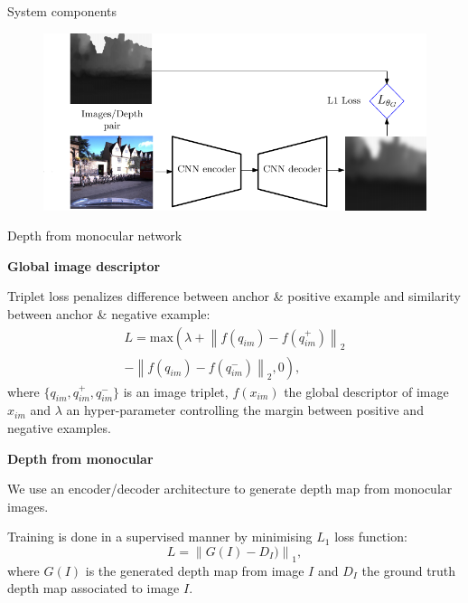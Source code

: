 \documentclass[final]{beamer}
\newlength{\colwidth}
\newcommand{\norm}[1]{\left\lVert#1\right\rVert}
\begin{document}
\begin{frame}[t]
\begin{columns}[t]
\begin{column}{\colwidth}
\begin{block}{System components}
    \begin{minipage}{0.75\linewidth}
        \centering
    	\begin{figure}
		  \includegraphics[width=\linewidth]{vect/method/fig3/enc_dec}
		\end{figure}	
    \end{minipage}\hfill
    \begin{minipage}{0.23\linewidth}
      	{\footnotesize Depth from monocular network}   
    \end{minipage}
    \vspace{1.5cm}
    
    \begin{minipage}[t]{0.52\linewidth}
    \textbf{Global image descriptor}
    
    {Triplet loss} penalizes difference between anchor \& positive example and similarity between anchor \& negative example:
	\begin{multline*}
     	L = \mathrm{max}\left(\lambda + \norm{f(q_{im}) - f(q_{im}^+)}_2 \right. \\	
	\left. - \norm{f(q_{im}) - f(q_{im}^-)}_2, 0 \right),
	\end{multline*}
where $\{q_{im}, q_{im}^+, q_{im}^-\}$ is an image triplet, $f(x_{im})$ the global descriptor of image $x_{im}$ and $\lambda$ an hyper-parameter controlling the margin between positive and negative examples.
    \end{minipage}\hfill
    \begin{minipage}[t]{0.45\linewidth}
	\textbf{Depth from monocular}
	
    We use an encoder/decoder architecture to generate depth map from monocular images.
    
	Training is done in a supervised manner by minimising $L_1$ loss function:
	\begin{equation*}
     	L = \norm{G(I) - D_I)}_1,
	\end{equation*}
where $G(I)$ is the generated depth map from image $I$ and  $D_I$ the ground truth depth map associated to image $I$.    
    \end{minipage}
  \end{block}
  

\end{column}
\end{columns}
\end{frame}
\end{document}
